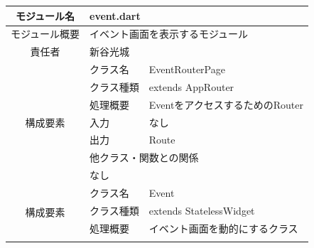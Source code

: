 \begin{table}[H]
  \centering
  \begin{tabular}{|c|l|l|} \hline
    モジュール名                & \multicolumn{2}{l|}{event.dart}                                                                             \\ \hline
    モジュール概要               & \multicolumn{2}{p{12cm}|}{イベント画面を表示するモジュール}                                                                 \\ \hline
    責任者                   & \multicolumn{2}{l|}{新谷光城}                                                                                   \\ \hline
    \multirow{7}{*}{構成要素} & クラス名                                                     & EventRouterPage                                  \\ \cline{2-3}
                          & クラス種類                                                    & extends AppRouter                                \\ \cline{2-3}
                          & 処理概要                                                     & \multicolumn{1}{p{12cm}|}{EventをアクセスするためのRouter} \\ \cline{2-3}
                          & 入力                                                       & なし                                               \\ \cline{2-3}
                          & 出力                                                       & Route                                            \\ \cline{2-3}
                          & \multicolumn{2}{l|}{他クラス・関数との関係}                                                                            \\ \cline{2-3}
                          & \multicolumn{2}{p{14cm}|}{なし}                                                                               \\ \hline
    \multirow{7}{*}{構成要素} & クラス名                                                     & Event                                            \\ \cline{2-3}
                          & クラス種類                                                    & extends StatelessWidget                          \\ \cline{2-3}
                          & 処理概要                                                     & \multicolumn{1}{p{12cm}|}{イベント画面を動的にするクラス}       \\ \cline{2-3}

\end{tabular}
\end{table}
